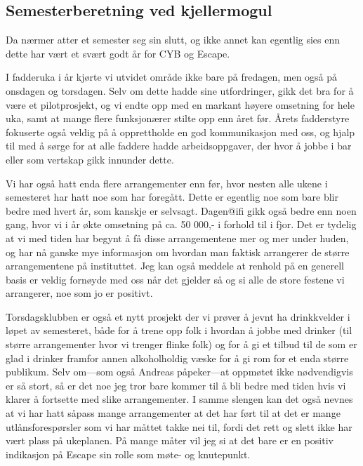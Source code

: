 \documentclass[10pt,norsk,a4paper]{article}
\begin{document}
\newpage


\subsection{Semesterberetning ved kjellermogul}

\begin{multicols}{2}
	Da nærmer atter et semester seg sin slutt, og ikke annet kan egentlig sies enn dette har vært et svært godt år for CYB og Escape.

	I fadderuka i år kjørte vi utvidet område ikke bare på fredagen, men også på onsdagen og torsdagen. Selv om dette hadde sine utfordringer, gikk det bra for å være et pilotprosjekt, og vi endte opp med en markant høyere omsetning for hele uka, samt at mange flere funksjonærer stilte opp enn året før. Årets fadderstyre fokuserte også veldig på å opprettholde en god kommunikasjon med oss, og hjalp til med å sørge for at alle faddere hadde arbeidsoppgaver, der hvor å jobbe i bar eller som vertskap gikk innunder dette.

	Vi har også hatt enda flere arrangementer enn før, hvor nesten alle ukene i semesteret har hatt noe som har foregått. Dette er egentlig noe som bare blir bedre med hvert år, som kanskje er selvsagt. Dagen@ifi gikk også bedre enn noen gang, hvor vi i år økte omsetning på ca. 50 000,- i forhold til i fjor. Det er tydelig at vi med tiden har begynt å få disse arrangementene mer og mer under huden, og har nå ganske mye informasjon om hvordan man faktisk arrangerer de større arrangementene på instituttet. Jeg kan også meddele at renhold på en generell basis er veldig fornøyde med oss når det gjelder så og si alle de store festene vi arrangerer, noe som jo er positivt.

	Torsdagsklubben er også et nytt prosjekt der vi prøver å jevnt ha drinkkvelder i løpet av semesteret, både for å trene opp folk i hvordan å jobbe med drinker (til større arrangementer hvor vi trenger flinke folk) og for å gi et tilbud til de som er glad i drinker framfor annen alkoholholdig væske for å gi rom for et enda større publikum. Selv om---som også Andreas påpeker---at oppmøtet ikke nødvendigvis er så stort, så er det noe jeg tror bare kommer til å bli bedre med tiden hvis vi klarer å fortsette med slike arrangementer. I samme slengen kan det også nevnes at vi har hatt såpass mange arrangementer at det har ført til at det er mange utlånsforespørsler som vi har måttet takke nei til, fordi det rett og slett ikke har vært plass på ukeplanen. På mange måter vil jeg si at det bare er en positiv indikasjon på Escape sin rolle som møte- og knutepunkt.


\end{multicols}
\end{document}
